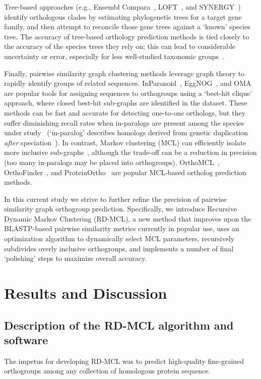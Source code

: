 \documentclass[twocolumn]{bmcart}%
\begin{document}
Tree-based approaches (e.g., Ensembl Compara~\cite{Vilella:2009ju}, LOFT~\cite{vanderHeijden:2007bo}, and SYNERGY~\cite{Wapinski:2007fa}) identify orthologous clades by estimating phylogenetic trees for a target gene family, and then attempt to reconcile those gene trees against a `known' species tree.
The accuracy of tree-based orthology prediction methods is tied closely to the accuracy of the species trees they rely on;
this can lead to considerable uncertainty or error, especially for less well-studied taxonomic groups~\cite{Xu:2016ek}.

Finally, pairwise similarity graph clustering methods leverage graph theory to rapidly identify groups of related sequences.
InParanoid~\cite{OBrien:2005cy}, EggNOG~\cite{Jensen:2007cc}, and OMA~\cite{Roth:2009iu} are popular tools for assigning sequences to orthogroups using a `best-hit clique' approach, where closed best-hit sub-graphs are identified in the dataset.
These methods can be fast and accurate for detecting one-to-one orthologs, but they suffer diminishing recall rates when in-paralogs are present among the species under study~\cite{Dalquen:2013fz} (`in-paralog' describes homologs derived from genetic duplication \textit{after} speciation~\cite{Sonnhammer:2002vm,Tekaia:2016ga}).
In contrast, Markov clustering (MCL) can efficiently isolate more inclusive sub-graphs~\cite{VanDongen:kJZ890qx,Enright:2002uq}, although the trade-off can be a reduction in precision (too many in-paralogs may be placed into orthogroups).
OrthoMCL~\cite{Li:2003en}, OrthoFinder~\cite{Emms:2015ig}, and ProteinOrtho~\cite{Lechner:2011jk} are popular MCL-based ortholog prediction methods.

In this current study we strive to further refine the precision of pairwise similarity graph orthogroup prediction.
Specifically, we introduce Recursive Dynamic Markov Clustering (RD-MCL), a new method that improves upon the BLASTP-based pairwise similarity metrics currently in popular use, uses an optimization algorithm to dynamically select MCL parameters, recursively subdivides overly inclusive orthogroups, and implements a number of final `polishing' steps to maximize overall accuracy.



\section{Results and Discussion}\label{sec:resultsAndDiscussion}
\subsection{Description of the RD-MCL algorithm and software}\label{subsec:descriptionOfTheRd-mclAlgorithmAndSoftware}
The impetus for developing RD-MCL was to predict high-quality fine-grained orthogroups among any collection of homologous protein sequence.
\end{document}
